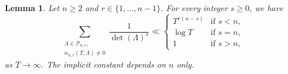 \documentclass[11pt,reqno]{amsart}
\newtheorem{lem}[thm]{Lemma}
\theoremstyle{definition}
\theoremstyle{remark}
\numberwithin{equation}{section}
\numberwithin{thm}{section}
\numberwithin{table}{section}
\begin{document}
\begin{lem}
\label{lem:inverse_determinant_bound}
Let $ n \ge 2$ and $r\in \{1,\ldots,n-1 \}$. 
For every integer $s \ge 0$, we have
\begin{equation*}
    \sum_{\substack{\Lambda \in \mathcal{P}_{n,r}, \\
    \alpha_{n,r}(T,\Lambda) \neq 0}}
    \frac{1}{\det(\Lambda)^s}
    \ll
    \begin{cases}
        T^{r(n-s)} & \text{if } s < n,\\
        \log T & \text{if } s = n,\\
        1 & \text{if } s > n,
    \end{cases}
\end{equation*}
 as $T \to \infty$. The implicit constant depends on $n$ only.
\end{lem}
\end{document}
